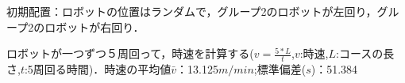 初期配置：ロボットの位置はランダムで，グループ2のロボットが左回り，グループ2のロボットが右回り．


ロボットが一つずつ５周回って，時速を計算する($v=\frac{5*L}{t}$,$v$:時速,$L$:コースの長さ,$t$:5周回る時間)．時速の平均値$\bar v$：13.125$m/min$;標準偏差($s$)：51.384


